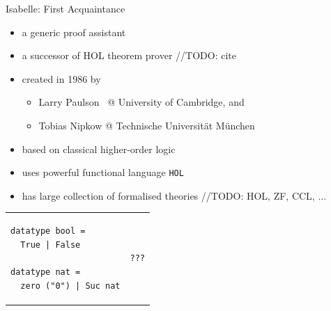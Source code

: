 \documentclass[aspectratio=169, fleqn]{beamer}
\begin{document}
\begin{frame}[fragile]{Isabelle: First Acquaintance}


\vspace{10pt}
\begin{itemize}
  \item a generic proof assistant
  \item a successor of HOL theorem prover //TODO: cite
  \item created in 1986 by
    \begin{itemize}
    \item Larry Paulson \ @ University of Cambridge, and
    \item Tobias Nipkow @ Technische Universit\"{a}t M\"{u}nchen
    \end{itemize}
  \item based on classical higher-order logic
  \item \textcolor{dkgray}{ uses powerful functional language \texttt{HOL} }
  \item \textcolor{dkgray}{ has large collection of formalised theories  //TODO: HOL, ZF, CCL, ... }
\end{itemize}

\begin{tabular}{p{.45\linewidth} p{.45\linewidth}}
\begin{lstlisting}[language=isabelle, caption={Definition of basic datatypes 
%in Isabelle:
}]
datatype bool = 
  True | False
  
datatype nat = 
  zero ("0") | Suc nat
\end{lstlisting}
&
   
\begin{lstlisting}[language=isabelle,caption={???}]
???
\end{lstlisting}
\end{tabular}

\end{frame}
\end{document}
